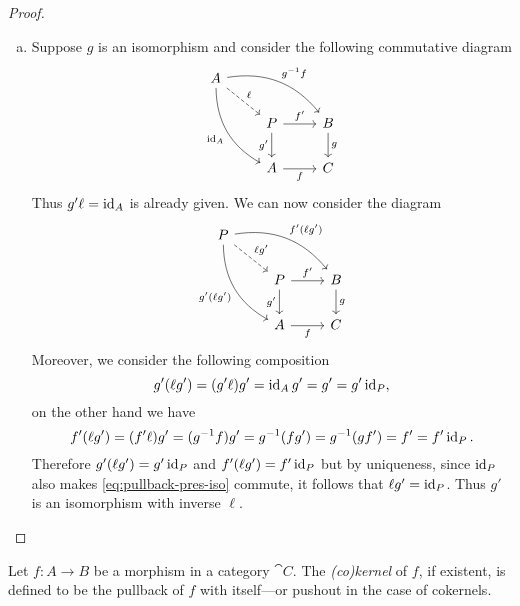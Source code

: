 \begin{proof}
\begin{enumerate}[(a)]
        \item Suppose \(g\) is an isomorphism and consider the following commutative
              diagram
              \[
                  \begin{tikzcd}
                      A \ar[rrd, "g^{-1} f", bend left]
                      \ar[drd, "\Id_{A}"', bend right]
                      \ar[rd, "\ell", dashed]
                      & &
                      \\
                      &P \ar[r, "f'"] \ar[d, "g'"']
                      &B \ar[d, "g"]
                      \\
                      &A \ar[r, "f"'] &C
                  \end{tikzcd}
              \]
              Thus \(g' \ell = \operatorname{id}_A\) is already given. We can now consider the diagram
              \begin{equation}\label{eq:pullback-pres-iso}
                  \begin{tikzcd}
                      P \ar[rrd, "f' (\ell g')", bend left]
                      \ar[drd, "g' (\ell g')"', bend right]
                      \ar[rd, "\ell g'", dashed]
                      & &
                      \\
                      &P \ar[r, "f'"] \ar[d, "g'"']
                      &B \ar[d, "g"]
                      \\
                      &A \ar[r, "f"'] &C
                  \end{tikzcd}
              \end{equation}
              Moreover, we consider the following composition
              \[
                  g' (\ell g') = (g' \ell) g' = \operatorname{id}_A g' = g' = g' \operatorname{id}_P,
              \]
              on the other hand we have
              \[
                  f' (\ell g') = (f' \ell) g'
                  = (g^{-1} f) g' = g^{-1} (f g')
                  = g^{-1} (g f') = f' = f' \operatorname{id}_P.
              \]
              Therefore \(g' (\ell g') = g' \operatorname{id}_P\) and \(f' (\ell g') = f' \operatorname{id}_P\) but by
              uniqueness, since \(\operatorname{id}_P\) also makes \cref{eq:pullback-pres-iso} commute, it
              follows that \(\ell g' = \operatorname{id}_P\). Thus \(g'\) is an isomorphism with inverse
              \(\ell\).
    \end{enumerate}
\end{proof}

\begin{definition}
    \label{def:kernel-cokernel}
    Let \(f: A \to B\) be a morphism in a category \(\cat C\). The \emph{(co)kernel}
    of \(f\), if existent, is defined to be the pullback of \(f\) with itself---or
    pushout in the case of cokernels.
\end{definition}

